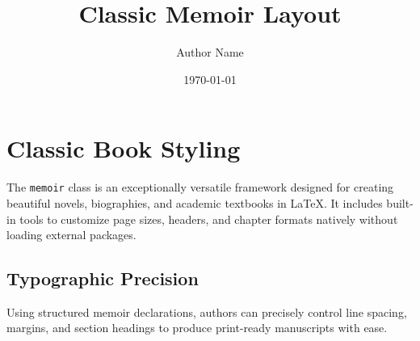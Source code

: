 \documentclass[11pt,a4paper,extrafontsizes]{memoir}
\title{Classic Memoir Layout}
\author{Author Name}
\date{\today}
\begin{document}
\maketitle

\chapter{Classic Book Styling}
The \texttt{memoir} class is an exceptionally versatile framework designed for creating beautiful novels, biographies, and academic textbooks in LaTeX. It includes built-in tools to customize page sizes, headers, and chapter formats natively without loading external packages.

\section{Typographic Precision}
Using structured memoir declarations, authors can precisely control line spacing, margins, and section headings to produce print-ready manuscripts with ease.
\end{document}

